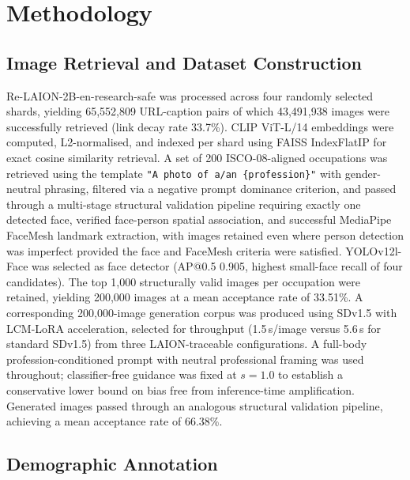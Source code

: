 \section{Methodology}

\subsection{Image Retrieval and Dataset Construction}

Re-LAION-2B-en-research-safe was processed across four randomly selected shards,
yielding 65,552,809 URL-caption pairs of which 43,491,938 images were successfully
retrieved (link decay rate 33.7\%). CLIP ViT-L/14 embeddings were computed, L2-normalised,
and indexed per shard using FAISS IndexFlatIP for exact cosine similarity retrieval. A
set of 200 ISCO-08-aligned occupations was retrieved using the template
\texttt{"A photo of a/an \{profession\}"} with gender-neutral phrasing, filtered via a
negative prompt dominance criterion, and passed through a multi-stage structural
validation pipeline requiring exactly one detected face, verified face-person spatial
association, and successful MediaPipe FaceMesh landmark extraction, with images retained
even where person detection was imperfect provided the face and FaceMesh criteria were satisfied.
YOLOv12l-Face was selected as face detector (AP@0.5 0.905, highest small-face recall of four candidates).
The top 1,000 structurally valid images per occupation were retained, yielding 200,000 images at a mean acceptance rate of 33.51\%.
A corresponding 200,000-image generation corpus was produced using SDv1.5 with LCM-LoRA
acceleration, selected for throughput (1.5\,s/image versus 5.6\,s for standard SDv1.5)
from three LAION-traceable configurations. A full-body profession-conditioned prompt
with neutral professional framing was used throughout; classifier-free guidance was fixed
at $s{=}1.0$ to establish a conservative lower bound on bias free from inference-time
amplification. Generated images passed through an analogous structural validation
pipeline, achieving a mean acceptance rate of 66.38\%.



\subsection{Demographic Annotation}

